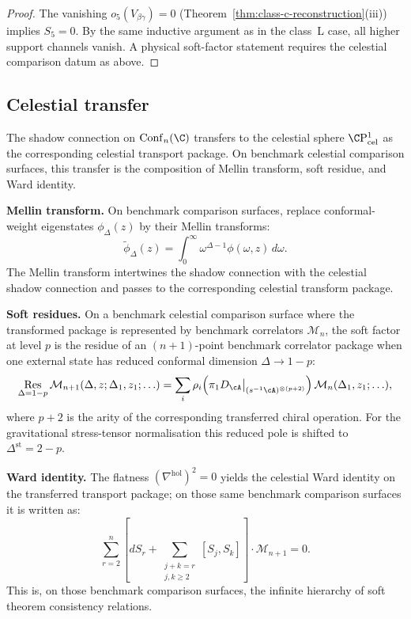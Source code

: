 \begin{proof}
The vanishing $o_5(V_{\beta\gamma}) = 0$ (Theorem~\ref{thm:class-c-reconstruction}(iii))
implies $S_5 = 0$. By the same inductive argument as in the class~L case, all higher
support channels vanish.  A physical soft-factor statement requires the
celestial comparison datum as above.
\end{proof}

\subsection{Celestial transfer}

\begin{construction}
The shadow connection on $\mathrm{Conf}_n(\C)$ transfers to the celestial sphere
$\C\mathrm{P}^1_{\mathrm{cel}}$ as the corresponding celestial transport package.
On benchmark celestial comparison surfaces, this transfer is the
composition of Mellin transform, soft residue, and Ward identity.

\medskip\noindent\textbf{Mellin transform.}
On benchmark comparison surfaces, replace conformal-weight eigenstates
$\phi_\Delta(z)$ by their Mellin transforms:
\[
\widetilde{\phi}_\Delta(z) = \int_0^\infty \omega^{\Delta - 1} \phi(\omega, z)\, d\omega.
\]
The Mellin transform intertwines the shadow connection with the celestial shadow
connection and passes to the corresponding celestial transform package.

\medskip\noindent\textbf{Soft residues.}
On a benchmark celestial comparison surface where the transformed package is
represented by benchmark correlators $\mathcal{M}_n$, the soft factor at
level $p$ is the residue of an $(n+1)$-point benchmark correlator package
when one external state has reduced conformal dimension $\Delta \to 1-p$:
\begin{equation}
\operatorname*{Res}_{\Delta=1-p}
\mathcal{M}_{n+1}(\Delta, z; \Delta_1, z_1; \ldots)
=
\sum_i
\rho_i\!\left(\pi_1D_\cA\big|_{(s^{-1}\cA)^{\otimes(p+2)}}\right)
\mathcal{M}_n(\Delta_1, z_1; \ldots),
\end{equation}
where $p+2$ is the arity of the corresponding transferred chiral operation.
For the gravitational stress-tensor normalisation this reduced pole is shifted
to $\Delta^{\mathrm{st}}=2-p$.

\medskip\noindent\textbf{Ward identity.}
The flatness $(\nabla^{\mathrm{hol}})^2 = 0$ yields the celestial Ward identity on
the transferred transport package; on those same benchmark comparison surfaces it
is written as:
\begin{equation}
\sum_{r=2}^{n}
\left[d S_r + \sum_{\substack{j + k = r \\ j,k \geq 2}} [S_j, S_k]\right]
\cdot \mathcal{M}_{n+1} = 0.
\end{equation}
This is, on those benchmark comparison surfaces, the infinite hierarchy of soft
theorem consistency relations.
\end{construction}

